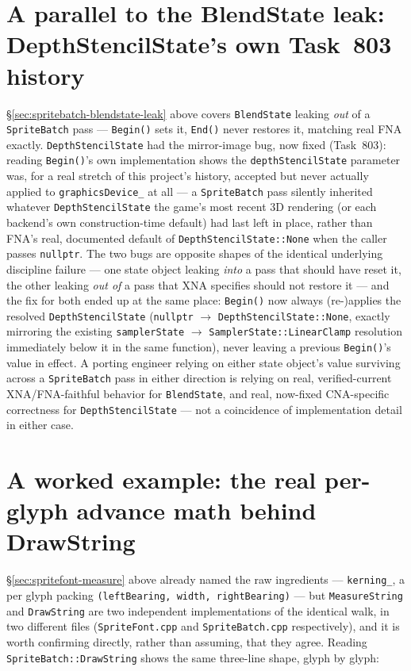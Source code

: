 \section{A parallel to the BlendState leak: DepthStencilState's own Task~803 history}

\S\ref{sec:spritebatch-blendstate-leak} above covers \texttt{BlendState} leaking \emph{out} of
a \texttt{SpriteBatch} pass --- \texttt{Begin()} sets it, \texttt{End()} never restores it,
matching real FNA exactly. \texttt{DepthStencilState} had the mirror-image bug, now fixed
(Task~803): reading \texttt{Begin()}'s own implementation shows the
\texttt{depthStencilState} parameter was, for a real stretch of this project's history,
accepted but never actually applied to \texttt{graphicsDevice\_} at all --- a
\texttt{SpriteBatch} pass silently inherited whatever \texttt{DepthStencilState} the game's
most recent 3D rendering (or each backend's own construction-time default) had last left in
place, rather than FNA's real, documented default of \texttt{DepthStencilState::None} when the
caller passes \texttt{nullptr}. The two bugs are opposite shapes of the identical underlying
discipline failure --- one state object leaking \emph{into} a pass that should have reset it,
the other leaking \emph{out of} a pass that XNA specifies should not restore it --- and the fix
for both ended up at the same place: \texttt{Begin()} now always (re-)applies the resolved
\texttt{DepthStencilState} (\texttt{nullptr} $\to$ \texttt{DepthStencilState::None}, exactly
mirroring the existing \texttt{samplerState} $\to$ \texttt{SamplerState::LinearClamp}
resolution immediately below it in the same function), never leaving a previous
\texttt{Begin()}'s value in effect. A porting engineer relying on either state object's value
surviving across a \texttt{SpriteBatch} pass in either direction is relying on real,
verified-current XNA/FNA-faithful behavior for \texttt{BlendState}, and real, now-fixed
CNA-specific correctness for \texttt{DepthStencilState} --- not a coincidence of implementation
detail in either case.

\section{A worked example: the real per-glyph advance math behind DrawString}
\label{sec:spritebatch-drawstring-advance}

\S\ref{sec:spritefont-measure} above already named the raw ingredients --- \texttt{kerning\_},
a  per glyph packing \texttt{(leftBearing, width, rightBearing)} --- but
\texttt{MeasureString} and \texttt{DrawString} are two independent implementations of the
identical walk, in two different files (\texttt{SpriteFont.cpp} and \texttt{SpriteBatch.cpp}
respectively), and it is worth confirming directly, rather than assuming, that they agree.
Reading \texttt{SpriteBatch::DrawString} shows the same three-line shape, glyph by glyph:

